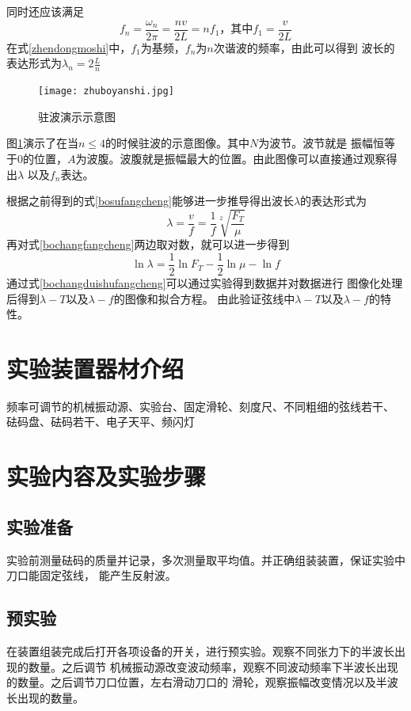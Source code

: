 \documentclass{ctexart}
\begin{document}
同时还应该满足
\begin{equation}\label{zhendongmoshi}
  f_{n}=\frac{\omega _{n}}{2\pi}=\frac{nv}{2L}=nf_{1}\mbox{，其中}f_{1}=\frac{v}{2L}
\end{equation}
在式\ref{zhendongmoshi}中，$f_{1}$为基频，$f_{n}$为$n$次谐波的频率，由此可以得到
波长的表达形式为$\lambda_{n}=2\frac{L}{n}$

\begin{figure}[b]
  \centering
  \texttt{[image: zhuboyanshi.jpg]}
  \caption{驻波演示示意图}\label{zhuboyanshi}
\end{figure}

图\ref{zhuboyanshi}演示了在当$n\leq 4$的时候驻波的示意图像。其中$N$为波节。波节就是
振幅恒等于0的位置，$A$为波腹。波腹就是振幅最大的位置。由此图像可以直接通过观察得出$\lambda$
以及$f_{n}$表达。

根据之前得到的式\ref{bosufangcheng}能够进一步推导得出波长$\lambda$的表达形式为
\begin{equation}\label{bochangfangcheng}
  \lambda = \frac{v}{f} =\frac{1}{f}\sqrt[2]{\frac{F_{T}}{\mu}}
\end{equation}
再对式\ref{bochangfangcheng}两边取对数，就可以进一步得到
\begin{equation}\label{bochangduishufangcheng}
  \ln \lambda = \frac{1}{2} \ln F_{T}-\frac{1}{2} \ln \mu - \ln f
\end{equation}
通过式\ref{bochangduishufangcheng}可以通过实验得到数据并对数据进行
图像化处理后得到$\lambda - T$以及$\lambda -f$的图像和拟合方程。
由此验证弦线中$\lambda - T$以及$\lambda -f$的特性。

\section{实验装置器材介绍}
频率可调节的机械振动源、实验台、固定滑轮、刻度尺、不同粗细的弦线若干、
砝码盘、砝码若干、电子天平、频闪灯

\section{实验内容及实验步骤}
  \subsection{实验准备}
  实验前测量砝码的质量并记录，多次测量取平均值。并正确组装装置，保证实验中刀口能固定弦线，
  能产生反射波。
  \subsection{预实验}
  在装置组装完成后打开各项设备的开关，进行预实验。观察不同张力下的半波长出现的数量。之后调节
  机械振动源改变波动频率，观察不同波动频率下半波长出现的数量。之后调节刀口位置，左右滑动刀口的
  滑轮，观察振幅改变情况以及半波长出现的数量。
\end{document}
